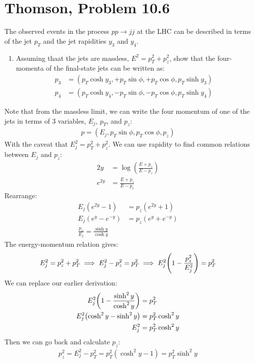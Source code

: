 \documentclass[12pt]{article}
\begin{document}
\section{Thomson, Problem 10.6}
\begin{problem}
  The observed events in the process $pp\to jj$ at the LHC can be described in terms of the jet $p_T$ and the jet rapidities $y_3$ and $y_4$.
  \begin{enumerate}[label = (\alph*)]
  \item Assuming thaat the jets are massless, $E^2=p_T^2+p_z^2$, show that the four-momenta of the final-state jets can be written as:
    \begin{align*}
      p_3&=(p_T\cosh y_3,+p_T\sin\phi,+p_T\cos\phi,p_T\sinh y_3)\\
      p_4&=(p_T\cosh y_4,-p_T\sin\phi,-p_T\cos\phi,p_T\sinh y_4)
    \end{align*}
  \end{enumerate}
\end{problem}
Note that from the massless limit, we can write the four momentum of one of the jets in terms of 3 variables, $E_j$, $p_T$, and $p_z$:
\begin{align*}
  p=(E_j,p_T\sin\phi,p_T\cos\phi,p_z)
\end{align*}
With the caveat that $E_j^2=p_T^2+p_z^2$. We can use rapidity to find common relations between $E_j$ and $p_z$:
\begin{align*}
  2y&=\log(\frac{E+p_z}{E-p_z})\\
  e^{2y}&=\frac{E+p_z}{E-p_z}
\end{align*}
Rearrange:
\begin{align*}
  E_j(e^{2y}-1)&=p_z(e^{2y}+1)\\
  E_j(e^y-e^{-y})&=p_z(e^y+e^{-y})\\
  \frac{p_z}{E_j}=\frac{\sinh y}{\cosh y}
\end{align*}
The energy-momentum relation gives:
\begin{align*}
  E_j^2=p_z^2+p_T^2\implies
  E_j^2-p_z^2=p_T^2\implies
  E_j^2\qty(1-\frac{p_z^2}{E^2_j})=p_T^2
\end{align*}
We can replace our earlier derivation:
\begin{align*}
  E_j^2\qty(1-\frac{\sinh^2y}{\cosh^2y})&=p_T^2\\
  E_j^2\qty(\cosh^2y-\sinh^2y)&=p_T^2\cosh^2y\\
  E_j^2&=p_T^2\cosh^2y
\end{align*}
Then we can go back and calculate $p_z$:
\begin{align*}
  p_z^2=E_j^2-p_T^2=p_T^2(\cosh^2y-1)=p_T^2\sinh^2y
\end{align*}
\end{document}
